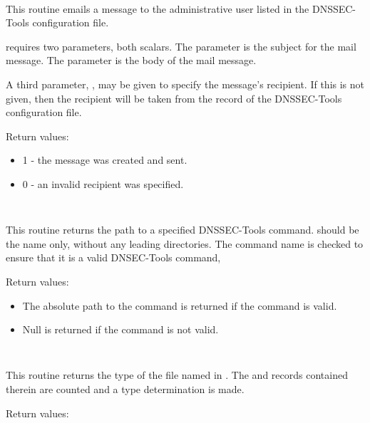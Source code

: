 \begin{description}

\item {}\verb" "

This routine emails a message to the administrative user listed in the
DNSSEC-Tools configuration file.

 requires two parameters, both scalars.
The  parameter is the subject for the mail message.
The  parameter is the body of the mail message.

A third parameter, , may be given to specify the message's
recipient.  If this is not given, then the recipient will be taken from
the  record of the DNSSEC-Tools configuration file.

Return values:

\begin{itemize}

\item 1 - the message was created and sent.
\item 0 - an invalid recipient was specified. 

\end{itemize}

\item {}\verb" "

This routine returns the path to a specified DNSSEC-Tools command.
 should be the name only, without any leading directories.
The command name is checked to ensure that it is a valid DNSEC-Tools command,

Return values:

\begin{itemize}

\item The absolute path to the command is returned if the command is valid.
\item Null is returned if the command is not valid.

\end{itemize}

\item {}\verb" "

This routine returns the type of the file named in .  The
 and  records contained therein are
counted and a type determination is made.

Return values:


\end{description}
